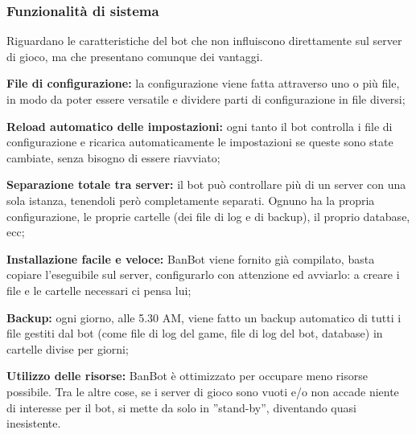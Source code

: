 \documentclass[a4paper]{article}
\begin{document}
\subsubsection {Funzionalit\`a di sistema}
Riguardano le  caratteristiche del bot che non influiscono direttamente sul server di gioco, ma che presentano comunque dei vantaggi.
\begin{description}
\item {\textbf{File di configurazione:}} la configurazione viene fatta attraverso uno o pi\`u file, in modo da poter essere versatile e dividere parti di configurazione in file diversi;
\item{\textbf{Reload automatico delle impostazioni:}} ogni tanto il bot controlla i file di configurazione e ricarica automaticamente le impostazioni se queste sono state cambiate, senza bisogno di essere riavviato;
\item{\textbf{Separazione totale tra server:}} il bot pu\`o controllare pi\`u di un server con una sola istanza, tenendoli per\`o completamente separati. Ognuno ha la propria configurazione, le proprie cartelle (dei file di log e di backup), il proprio database, ecc;
\item{\textbf{Installazione facile e veloce:}} BanBot viene fornito gi\`a compilato, basta copiare l'eseguibile sul server, configurarlo con attenzione ed avviarlo: a creare i file e le cartelle necessari ci pensa lui;
\item{\textbf{Backup:}} ogni giorno, alle 5.30 AM, viene fatto un backup automatico di tutti i file gestiti dal bot (come file di log del game, file di log del bot, database) in cartelle divise per giorni;
\item{\textbf{Utilizzo delle risorse:}} BanBot \`e ottimizzato per occupare meno risorse possibile. Tra le altre cose, se i server di gioco sono vuoti e/o non accade niente di interesse per il bot, si mette da solo in ''stand-by'', diventando quasi inesistente.
\end{description}
\end{document}
